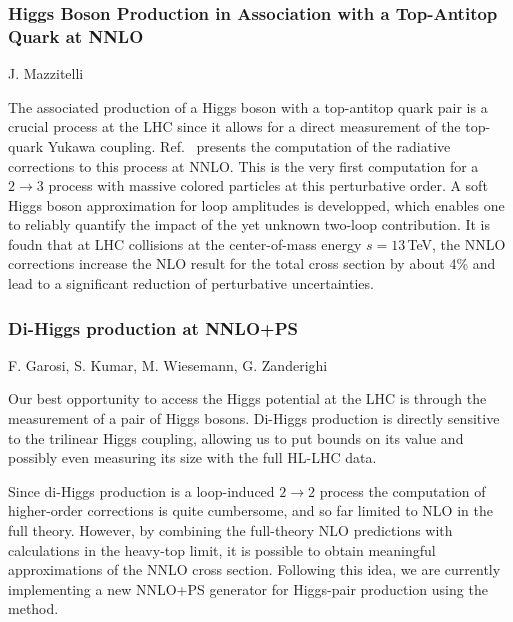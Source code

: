 \documentclass{FBR_Bericht_2025}
\begin{document}
\begin{refsection}
\subsubsection{Higgs Boson Production in Association with a Top-Antitop Quark at NNLO}
\begin{Namen}
 J. Mazzitelli 
\end{Namen}

The associated production of a Higgs boson with a top-antitop quark pair is a crucial process at the LHC since it allows for a direct measurement of the top-quark Yukawa coupling. Ref.~\cite{Catani:2022mfv} presents the computation of the radiative corrections to this process at NNLO. This is the very first computation for a $2 \to 3$  process with massive colored particles at this perturbative order. A soft Higgs boson approximation for loop amplitudes is developped, which enables one to reliably quantify the impact of the yet unknown two-loop contribution. It is foudn that at LHC collisions at the center-of-mass energy $s=13$\,TeV, the NNLO corrections increase the NLO result for the total cross section by about 4\% and lead to a significant reduction of perturbative uncertainties.

\subsubsection{Di-Higgs production at NNLO+PS}
\begin{Namen}
F. Garosi, S. Kumar, M. Wiesemann, G. Zanderighi
\end{Namen}
Our best opportunity to access the Higgs potential at the LHC is through the measurement
of a pair of Higgs bosons. Di-Higgs production is directly sensitive to the trilinear Higgs coupling,
allowing us to put bounds on its value and possibly even measuring its size with the full HL-LHC data.

Since di-Higgs production is a loop-induced $2\to 2$ process the computation of higher-order 
corrections is quite cumbersome, and so far limited to NLO in the full theory. However, by combining
the full-theory NLO predictions with calculations in the heavy-top limit, it is possible to obtain 
meaningful approximations of the NNLO cross section. Following this idea, we are currently 
implementing a new NNLO+PS generator for Higgs-pair production using the \minnlo{} method.

%

\end{refsection}
\end{document}
